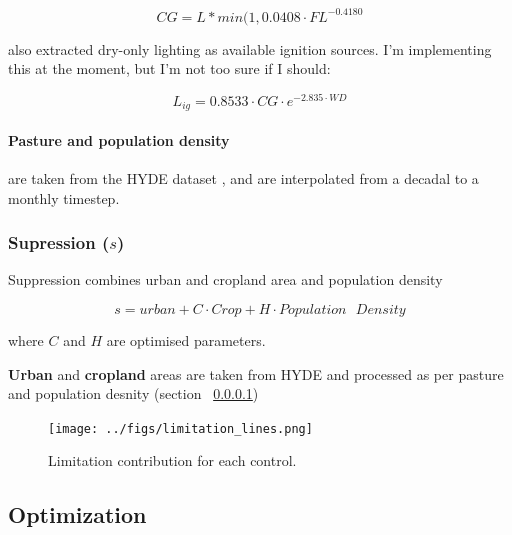 \begin{equation}
    CG = L * min(1, 0.0408 \cdot FL^{-0.4180}
\end{equation}

\begin{shaded}
    \citet{kelley2014improved} also extracted dry-only lighting as available ignition sources. I'm implementing this at the moment, but I'm not too sure if I should:

\begin{equation}
    L_{ig} = 0.8533 \cdot CG \cdot e^{-2.835 \cdot WD}
\end{equation}
\end{shaded}

\paragraph{Pasture and population density}
\label{Pasture}
are taken from the HYDE dataset \citep{klein2007mapping}, and are interpolated from a decadal to a monthly timestep.

\subsubsection{Supression ($s$)}

Suppression combines urban and cropland area and population density

\begin{equation}
    s = urban + C \cdot Crop + H \cdot Population\text{ }Density
    \label{equ:Supression}
\end{equation}

where $C$ and $H$ are optimised parameters.

\textbf{Urban} and \textbf{cropland} areas are taken from HYDE and processed as per pasture and population desnity (section ~\ref{Pasture})


\begin{figure}[!ht]
  \centering
    \texttt{[image: ../figs/limitation\_lines.png]}

  \caption{Limitation contribution for each control.}
  \label{fig:lim_lines}
\end{figure}

\subsection{Optimization}

